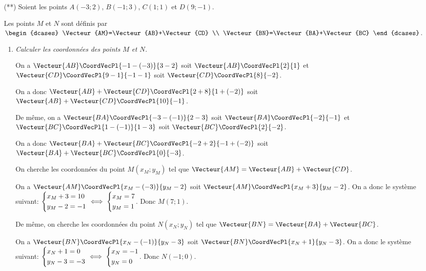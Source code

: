 \documentclass[a4paper]{article}
\begin{document}
\begin{exercice}{(**)}{}
  Soient les points $A(-3;2)$, $B(-1;3)$, $C(1;1)$ et $D(9;-1)$.

  Les points $M$ et $N$ sont définis par $\begin{dcases}
    \Vecteur{AM}=\Vecteur{AB}+\Vecteur{CD} \\
    \Vecteur{BN}=\Vecteur{BA}+\Vecteur{BC}  
  \end{dcases}$.

  \begin{enumerate}
    \item \textit{Calculer les coordonnées des points $M$ et $N$.}
    
    On a $\Vecteur{AB}\CoordVecPl{-1-(-3)}{3-2}$ soit $\Vecteur{AB}\CoordVecPl{2}{1}$ et $\Vecteur{CD}\CoordVecPl{9-1}{-1-1}$ soit $\Vecteur{CD}\CoordVecPl{8}{-2}$.
   
    On a donc $\Vecteur{AB}+\Vecteur{CD}\CoordVecPl{2+8}{1+(-2)}$ soit $\Vecteur{AB}+\Vecteur{CD}\CoordVecPl{10}{-1}$.

    De même, on a $\Vecteur{BA}\CoordVecPl{-3-(-1)}{2-3}$ soit $\Vecteur{BA}\CoordVecPl{-2}{-1}$ et $\Vecteur{BC}\CoordVecPl{1-(-1)}{1-3}$ soit $\Vecteur{BC}\CoordVecPl{2}{-2}$.
   
    On a donc $\Vecteur{BA}+\Vecteur{BC}\CoordVecPl{-2+2}{-1+(-2)}$ soit $\Vecteur{BA}+\Vecteur{BC}\CoordVecPl{0}{-3}$.


    On cherche les coordonnées du point $M(x_M;y_M)$ tel que $\Vecteur{AM}=\Vecteur{AB}+\Vecteur{CD}$.

    On a $\Vecteur{AM}\CoordVecPl{x_M-(-3)}{y_M-2}$ soit $\Vecteur{AM}\CoordVecPl{x_M+3}{y_M-2}$. On a donc le système suivant:
    $\begin{dcases}
      x_M+3=10\\
      y_M-2=-1
    \end{dcases} \iff \begin{dcases}
      x_M=7\\
      y_M=1
    \end{dcases}$. Donc $M(7;1)$.

    De même, on cherche les coordonnées du point $N(x_N;y_N)$ tel que $\Vecteur{BN}=\Vecteur{BA}+\Vecteur{BC}$.

    On a $\Vecteur{BN}\CoordVecPl{x_N-(-1)}{y_N-3}$ soit $\Vecteur{BN}\CoordVecPl{x_N+1}{y_N-3}$. On a donc le système suivant:
    $\begin{dcases}
      x_N+1=0\\
      y_N-3=-3
    \end{dcases} \iff \begin{dcases}
      x_N=-1\\
      y_N=0
    \end{dcases}$. Donc $N(-1;0)$.


\end{enumerate}
\end{exercice}
\end{document}
